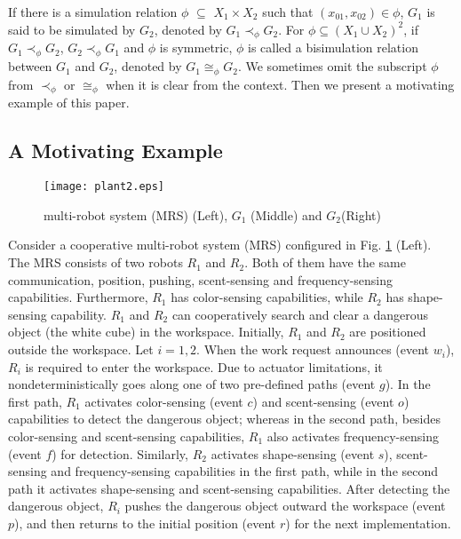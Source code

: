 \documentclass[preprint,authoryear,12pt]{elsarticle}
\begin{document}
If there is a simulation relation $\phi$ $\subseteq$ $X_{1} \times
X_{2}$ such that $(x_{01},x_{02}) \in \phi$, $G_{1}$ is said to be
simulated by $G_{2}$, denoted by $G_{1} \prec_{\phi} G_{2}$. For
$\phi \subseteq (X_1 \cup X_2)^{2}$, if $G_{1} \prec_{\phi}
G_{2}$, $G_{2} \prec_{\phi} G_{1}$ and $\phi$ is symmetric, $\phi$
is called a bisimulation relation between $G_{1}$ and $G_{2}$,
denoted by $G_{1} \cong_{\phi} G_{2}$. We sometimes omit the
subscript $\phi$ from $\prec_{\phi}$ or $\cong_{\phi}$ when it is
clear from the context. Then we present a motivating example of
this paper.



\subsection{A Motivating Example}

\begin{figure}[!htb]
\begin{center}
\texttt{[image: plant2.eps]}
\caption{ multi-robot system (MRS) (Left), $G_1$ (Middle) and
$G_2$(Right)} \label{plantdet}
\end{center}
\end{figure}
Consider a cooperative multi-robot system (MRS) configured in Fig.
\ref{plantdet} (Left). The MRS consists of two robots $R_1$ and
$R_2$. Both of them have the same communication, position,
pushing, scent-sensing and frequency-sensing capabilities.
Furthermore, $R_1$ has color-sensing capabilities, while $R_2$ has
shape-sensing capability. $R_1$ and $R_2$ can cooperatively search
and clear a dangerous object (the white cube) in the workspace.
Initially, $R_1$ and $R_2$ are positioned outside the workspace.
Let $i=1, 2$. When the work request announces (event $w_i$), $R_i$
is required to enter the workspace. Due to actuator limitations,
it nondeterministically goes along one of two pre-defined paths
(event $g$). In the first path, $R_1$ activates color-sensing
(event $c$) and scent-sensing (event $o$) capabilities to detect
the dangerous object; whereas in the second path, besides
color-sensing and scent-sensing capabilities, $R_1$ also activates
frequency-sensing (event $f$) for detection. Similarly, $R_2$
activates shape-sensing (event $s$), scent-sensing and
frequency-sensing capabilities in the first path, while in the
second path it activates shape-sensing and scent-sensing
capabilities. After detecting the dangerous object, $R_i$ pushes
the dangerous object outward the workspace (event $p$), and then
returns to the initial position (event $r$) for the next
implementation.
\end{document}
